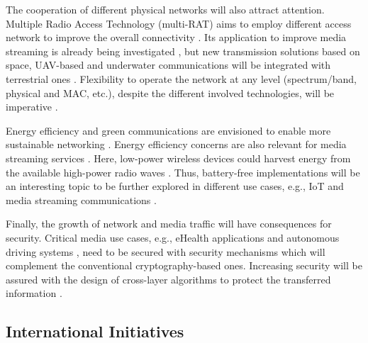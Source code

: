 The cooperation of different physical networks will also attract attention. Multiple Radio Access Technology (multi-RAT) aims to employ different access network to improve the overall connectivity \cite{galinina20155g}. Its application to improve media streaming is already being investigated \cite{basaras2020multicast, borst2017dynamic}, but new transmission solutions based on space, UAV-based and underwater communications will be integrated with terrestrial ones \cite{bhat20216g, akhtar2020shift}. Flexibility to operate the network at any level (spectrum/band, physical and MAC, etc.), despite the different involved technologies, will be imperative \cite{yazar6g}.

Energy efficiency and green communications \cite{huang2019survey} are envisioned to enable more sustainable networking \cite{renga2018self}. Energy efficiency concerns are also relevant for media streaming services \cite{abou2013predictive, mehrabi2019energy}. Here, low-power wireless devices could harvest energy from the available high-power radio waves \cite{yazar6g}. Thus, battery-free implementations will be an interesting topic to be further explored in different use cases, e.g., IoT \cite{xu2018practical} and media streaming communications \cite{naderiparizi2018towards, saffari2019battery}.

Finally, the growth of network and media traffic will have consequences for security. Critical media use cases, e.g., eHealth applications \cite{al2019ehealth} and autonomous driving systems \cite{cui2019review}, need to be secured with security mechanisms which will complement the conventional cryptography-based ones. Increasing security will be assured with the design of cross-layer algorithms to protect the transferred information \cite{yazar6g, wang2020security}.

\subsection{International Initiatives}
\label{sec:IEEECOMSTinternational}

